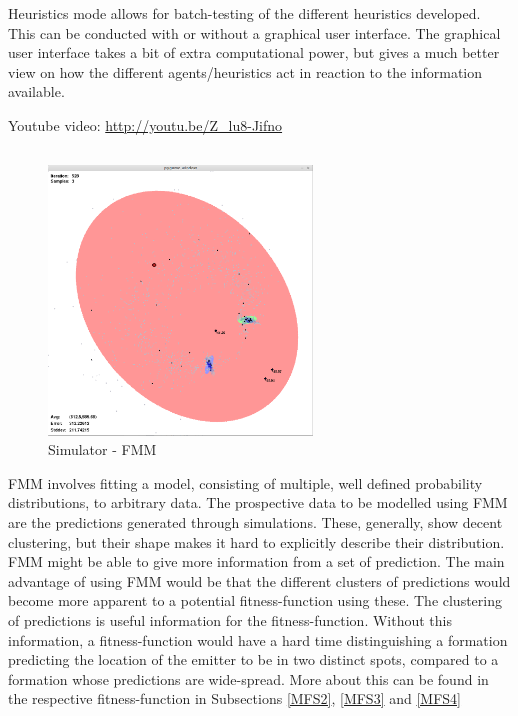 \documentclass[10pt,a4paper]{book}
\begin{document}
Heuristics mode allows for batch-testing of the different heuristics developed. This can be conducted with or without a graphical user interface. The graphical user interface takes a bit of extra computational power, but gives a much better view on how the different agents/heuristics act in reaction to the information available. 


Youtube video: \url{http://youtu.be/Z_lu8-Jifno}


\subsection{}
\label{M_INTER_FMM}


\begin{figure}[htp]
\centering
\includegraphics[width=70mm]{fmm.png}
\caption{Simulator - \gls{FMM}}
\end{figure}


\Gls{FMM} involves fitting a model, consisting of multiple, well defined probability distributions, to arbitrary data. The prospective data to be modelled using \gls{FMM} are the predictions generated through simulations. These, generally, show decent clustering, but their shape makes it hard to explicitly describe their distribution. \Gls{FMM} might be able to give more information from a set of prediction. The main advantage of using \gls{FMM} would be that the different clusters of predictions would become more apparent to a potential fitness-function using these. The clustering of predictions is useful information for the fitness-function. Without this information, a fitness-function would have a hard time distinguishing a formation predicting the location of the emitter to be in two distinct spots, compared to a formation whose predictions are wide-spread. More about this can be found in the respective fitness-function in Subsections \ref{MFS2},  \ref{MFS3} and \ref{MFS4}
\end{document}

